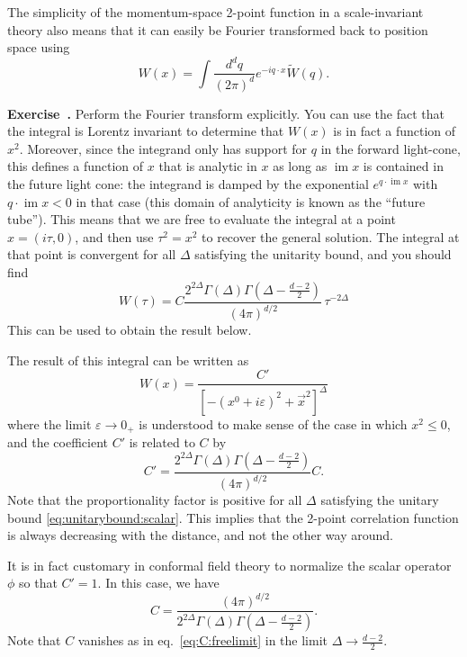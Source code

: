\documentclass[a4paper,12pt]{article}
\DeclareMathOperator{\im}{\text{im}}
\numberwithin{equation}{section}
\newcounter{exercise}[section]
\newenvironment{exercise}[1][]%
	{\refstepcounter{exercise}\bigskip
	\begin{mdframed}[backgroundcolor=gray!20, linewidth=0]
	\noindent\textbf{Exercise~\thesection.\theexercise #1} \rmfamily}
  	{\end{mdframed}\bigskip}
\begin{document}
The simplicity of the momentum-space 2-point function in a scale-invariant theory also means that it can easily be Fourier transformed back to position space using
\begin{equation}
	W(x) = \int \frac{d^dq}{(2\pi)^d} e^{- i q \cdot x}
	\widetilde{W}(q).
\end{equation}
\begin{exercise}
	Perform the Fourier transform explicitly.
	You can use the fact that the integral is Lorentz
	invariant to determine that $W(x)$ is in fact a function of $x^2$.
	Moreover, since the integrand only has support for $q$
	in the forward light-cone, this defines a function of $x$
	that is analytic in $x$ as long as $\im x$ is contained in 
	the future light cone: the integrand is damped by the
	exponential $e^{q \cdot \im x}$ with $q \cdot \im x < 0$
	in that case
	(this domain of analyticity is known as the ``future tube'').
	This means that we are free to evaluate the integral at a point 
	$x = (i \tau, 0)$, and then use $\tau^2 = x^2$ to recover the 
	general solution.
	The integral at that point is convergent for all $\Delta$
	satisfying the unitarity bound, and you should find
	$$
	W(\tau) = C \frac{2^{2\Delta} \Gamma(\Delta)
	\Gamma\left( \Delta - \frac{d-2}{2} \right)}
	{(4\pi)^{d/2}} \,
	\tau^{-2\Delta}
	$$
	This can be used to obtain the result below.
\end{exercise}
The result of this integral can be written as
\begin{equation}
	W(x) = \frac{C'}
	{\left[ -(x^0 + i \varepsilon)^2 + \vec{x}^2 \right]^\Delta}
\end{equation}
where the limit $\varepsilon \to 0_+$ is understood to make sense of the case in which $x^2 \leq 0$, and the coefficient $C'$ is related to $C$ by
\begin{equation}
	C' = \frac{2^{2\Delta} \Gamma(\Delta)
	\Gamma\left( \Delta - \frac{d-2}{2} \right)}
	{(4\pi)^{d/2}} C.
\end{equation}
Note that the proportionality factor is positive for all $\Delta$ satisfying the unitary bound \eqref{eq:unitarybound:scalar}. This implies that the 2-point correlation function is always decreasing with the distance, and not the other way around.

It is in fact customary in conformal field theory to normalize the scalar operator $\phi$ so that $C' = 1$. In this case, we have
\begin{equation}
	C = \frac{(4\pi)^{d/2}}
	{2^{2\Delta} \Gamma(\Delta)
	\Gamma\left( \Delta - \frac{d-2}{2} \right)}.
	\label{eq:standardnormalization}
\end{equation}
Note that $C$ vanishes as in eq.~\eqref{eq:C:freelimit} in the limit $\Delta \to \frac{d-2}{2}$.
	
\end{document}
